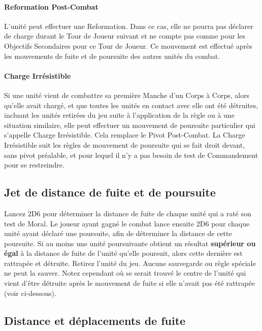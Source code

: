 \paragraph{Reformation Post-Combat}

L'unité peut effectuer une Reformation. Dans ce cas, elle ne pourra pas déclarer de charge durant le Tour de Joueur suivant et ne compte pas comme \scoringunit{} pour les Objectifs Secondaires pour ce Tour de Joueur. Ce mouvement est effectué après les mouvements de fuite et de poursuite des autres unités du combat.

\paragraph{Charge Irrésistible}

Si une unité vient de combattre sa première Manche d'un Corps à Corps, alors qu'elle avait chargé, et que toutes les unités en contact avec elle ont été détruites, incluant les unités retirées du jeu suite à l'application de la règle \unstable{} ou à une situation similaire, elle peut effectuer un mouvement de poursuite particulier qui s'appelle Charge Irrésistible. Cela remplace le Pivot Post-Combat. La Charge Irrésistible suit les règles de mouvement de poursuite qui se fait droit devant, sans pivot préalable, et pour lequel il n'y a pas besoin de test de Commandement pour se restreindre.

\subsection{Jet de distance de fuite et de poursuite}

Lancez 2D6 pour déterminer la distance de fuite de chaque unité qui a raté son test de Moral. Le joueur ayant gagné le combat lance ensuite 2D6 pour chaque unité ayant déclaré une poursuite, afin de déterminer la distance de cette poursuite. Si au moins une unité poursuivante obtient un résultat \textbf{supérieur ou égal} à la distance de fuite de l'unité qu'elle poursuit, alors cette dernière est rattrapée et détruite. Retirez l'unité du jeu. Aucune sauvegarde ou règle spéciale ne peut la sauver. Notez cependant où se serait trouvé le centre de l'unité qui vient d'être détruite après le mouvement de fuite si elle n'avait pas été rattrapée (voir ci-dessous).

\subsection{Distance et déplacements de fuite}

